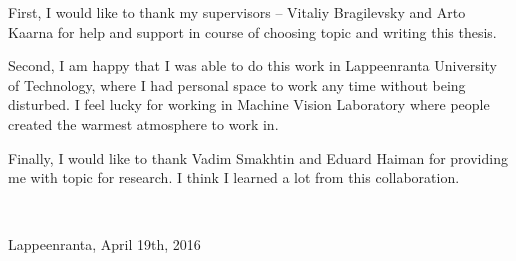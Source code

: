 
\begin{preface}
First, I would like to thank my supervisors -- Vitaliy Bragilevsky and Arto Kaarna for
help and support in course of choosing topic and writing this thesis.

Second, I am happy that I was able to do this work in Lappeenranta University of Technology,
where I had personal space to work any time without being disturbed. I feel lucky for
working in Machine Vision Laboratory where people created the warmest atmosphere to work in.

Finally, I would like to thank Vadim Smakhtin and Eduard Haiman for providing me with topic
for research. I think I learned a lot from this collaboration.


\

Lappeenranta, April 19th, 2016
\end{preface}